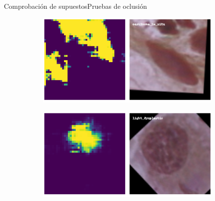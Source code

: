 \documentclass{beamer}
\begin{document}
    \begin{frame}{Comprobación de supuestos}{Pruebas de oclusión}
        \begin{figure}
            \begin{subfigure}{0.48\textwidth}
            \includegraphics[width=\textwidth]{occlusion-carcinoma_in_situ0.pdf}
            \end{subfigure}\hspace*{\fill}
            \begin{subfigure}{0.48\textwidth}
            \includegraphics[width=\textwidth]{occlusion-light_dysplastic13.pdf}
            \end{subfigure}
    

\end{figure}
\end{frame}
\end{document}
